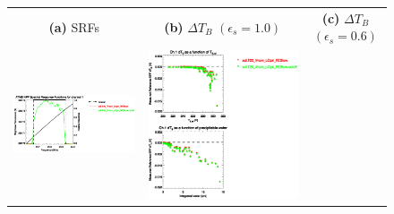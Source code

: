 \newpage
 
\begin{figure}[H]
  \centering
  \begin{tabular}{c c c}
    \textsf{\textbf{(a)} SRFs} &
    \textsf{\textbf{(b)} $\Delta T_B$ $(\epsilon_s = 1.0)$} &
    \textsf{\textbf{(c)} $\Delta T_B$ $(\epsilon_s = 0.6)$} \\
    \includegraphics[bb=80 400 280 558,clip,scale=0.85]{graphics/srf/Rset/atms_npp.ch1.osrf.eps} &
    \includegraphics[bb=85 400 260 558,clip,scale=0.85]{graphics/dtb/Rset/e1.0_r0.0/atms_npp.ch1.dTb.eps} & 

\end{tabular}
\end{figure}
